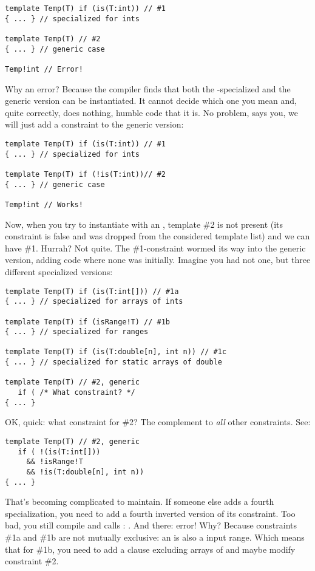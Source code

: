 \begin{verbatim}
template Temp(T) if (is(T:int)) // #1
{ ... } // specialized for ints

template Temp(T) // #2
{ ... } // generic case

Temp!int // Error!
\end{verbatim}

Why an error? Because the compiler finds that both the -specialized and the generic version can be instantiated. It cannot decide which one you mean and, quite correctly, does nothing, humble code that it is. No problem, says you, we will just add a constraint to the generic version:

\begin{verbatim}
template Temp(T) if (is(T:int)) // #1
{ ... } // specialized for ints

template Temp(T) if (!is(T:int))// #2
{ ... } // generic case

Temp!int // Works!
\end{verbatim}

Now, when you try to instantiate with an , template \#2 is not present (its constraint is false and was dropped from the considered template list) and we can have \#1. Hurrah? Not quite. The \#1-constraint wormed its way into the generic version, adding code where none was initially. Imagine you had not one, but three different specialized versions:

\begin{verbatim}
template Temp(T) if (is(T:int[])) // #1a
{ ... } // specialized for arrays of ints

template Temp(T) if (isRange!T) // #1b
{ ... } // specialized for ranges

template Temp(T) if (is(T:double[n], int n)) // #1c
{ ... } // specialized for static arrays of double

template Temp(T) // #2, generic
   if ( /* What constraint? */
{ ... }
\end{verbatim}

OK, quick: what constraint for \#2? The complement to \emph{all} other constraints. See:

\begin{verbatim}
template Temp(T) // #2, generic
   if ( !(is(T:int[]))
     && !isRange!T
     && !is(T:double[n], int n))
{ ... }
\end{verbatim}

That's becoming complicated to maintain. If someone else adds a fourth specialization, you need to add a fourth inverted version of its constraint. Too bad, you still compile and calls : \DD{[])}. And there: error! Why? Because constraints \#1a and \#1b are not mutually exclusive: an \DD{[]} is also a input range. Which means that for \#1b, you need to add a clause excluding arrays of  and maybe modify constraint \#2.

